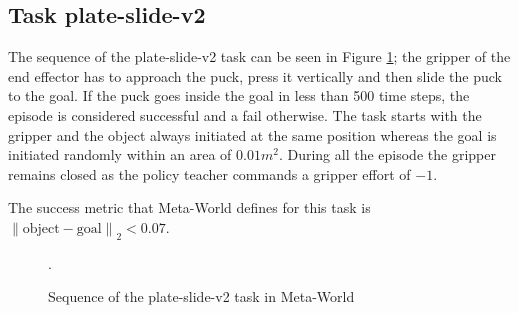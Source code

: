 \subsection{Task plate-slide-v2}
\label{subsection:metaworld-hockey-task}

The sequence of the plate-slide-v2 task can be seen in Figure \ref{fig:sequence-plate-slide}; the gripper of the end effector has to approach the puck, press it vertically and then slide the puck to the goal. If the puck goes inside the goal in less than 500 time steps, the episode is considered successful and a fail otherwise. The task starts with the gripper and the object always initiated at the same position whereas the goal is initiated randomly within an area of  $0.01m^2$. During all the episode the gripper remains closed as the policy teacher commands a gripper effort of $-1$.


The success metric that Meta-World defines for this task is ${\left\lVert \text{object}-\text{goal} \right\rVert}_2 < 0.07$.

 \begin{figure}[H]
  \centering
  \hspace*{\fill}%
   \hfill
   \hfill
  \hspace*{\fill}%
  \caption{Sequence of the plate-slide-v2 task in Meta-World}.
  \label{fig:sequence-plate-slide}
\end{figure}


